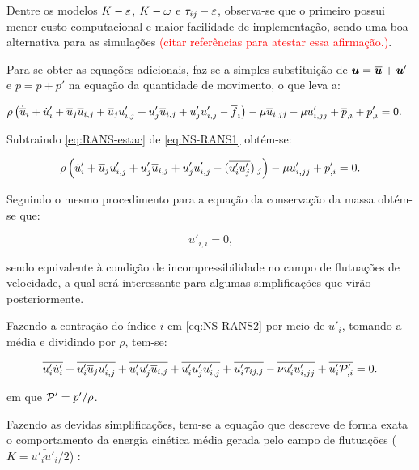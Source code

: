 Dentre os modelos $K-\varepsilon$, $K-\omega$ e $\tau_{ij}-\varepsilon$, observa-se que o primeiro possui menor custo computacional e maior facilidade de implementação, sendo uma boa alternativa para as simulações \textcolor{red}{(citar referências para atestar essa afirmação.)}.

Para se obter as equações adicionais, faz-se a simples substituição de $\boldsymbol{u}=\overline{\boldsymbol{u}}+\boldsymbol{u}'$ e $p=\bar{p}+p'$ na equação da quantidade de movimento, o que leva a:

\begin{equation}
    \begin{split}
        &\rho\left({\dot{\overline{u}}_i+\dot{u}'_i+\overline{u}_j\overline{u}_{i,j}+\overline{u}_ju'_{i,j}+u'_j\overline{u}_{i,j}+u'_ju'_{i,j}-\overline{f}_i}\right)-\mu\overline{u}_{i,jj}-\mu u'_{i,jj}+\overline{p}_{,i}+p'_{,i}=0\text{.}
    \end{split}
    \label{eq:NS-RANS1}
\end{equation}

Subtraindo \eqref{eq:RANS-estac} de \eqref{eq:NS-RANS1} obtém-se:

\begin{equation}
    \rho\left({\dot{u}'_i+\overline{u}_ju'_{i,j}+u'_j\overline{u}_{i,j}+u'_ju'_{i,j}-(\overline{u'_iu'_j})_{,j}}\right)-\mu u'_{i,jj}+p'_{,i}=0\text{.}
    \label{eq:NS-RANS2}
\end{equation}

Seguindo o mesmo procedimento para a equação da conservação da massa obtém-se que:

\begin{equation}
    u'_{i,i}=0\text{,}
\end{equation}

\noindent sendo equivalente à condição de incompressibilidade no campo de flutuações de velocidade, a qual será interessante para algumas simplificações que virão posteriormente.

Fazendo a contração do índice $i$ em \ref{eq:NS-RANS2} por meio de $u'_i$, tomando a média e dividindo por $\rho$, tem-se:

\begin{equation}
    \overline{u'_i\dot{u}'_i}+\overline{u'_i\overline{u}_ju'_{i,j}}+\overline{u'_iu'_j\overline{u}_{i,j}}+\overline{u'_iu'_ju'_{i,j}}+\overline{u'_i\tau_{ij,j}}-\overline{\nu u'_iu'_{i,jj}}+\overline{u'_i\mathcal{P}'_{,i}}=0\text{.}
\end{equation}

\noindent em que $\mathcal{P}'=p'/\rho$.

Fazendo as devidas simplificações, tem-se a equação que descreve de forma exata o comportamento da energia cinética média gerada pelo campo de flutuações ($K=\bar{u'_iu'_i}/2$) \cite{alfonsi2009reynolds}:


